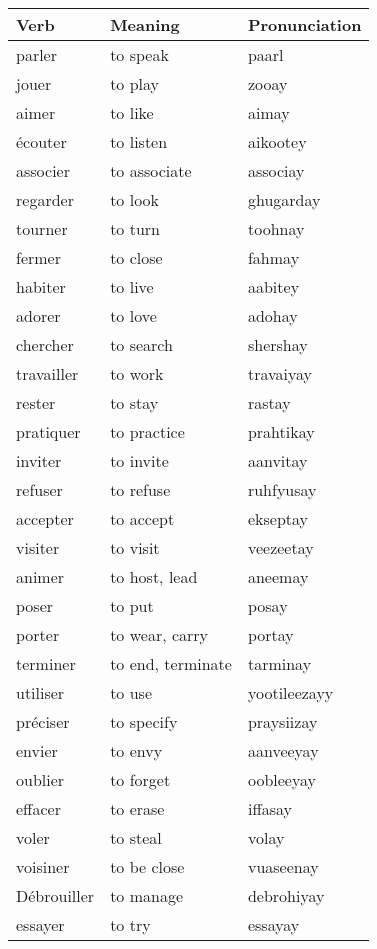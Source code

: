 \begin{longtable}{| l | l | l |}
\hline
Verb 		& Meaning 		& Pronunciation	\\
\hline
\endhead
parler		& to speak		& paarl			\\ 	\hline
jouer		& to play		& zooay			\\	\hline
aimer		& to like		& aimay			\\	\hline
\'ecouter	& to listen		& aikootey		\\	\hline
associer	& to associate	& associay		\\	\hline
regarder	& to look		& ghugarday		\\	\hline
tourner		& to turn		& toohnay		\\	\hline
fermer		& to close		& fahmay		\\	\hline
habiter		& to live		& aabitey		\\	\hline
adorer 		& to love		& adohay		\\	\hline
chercher	& to search		& shershay		\\	\hline
travailler	& to work		& travaiyay		\\	\hline
rester      & to stay       & rastay        \\  \hline
pratiquer   & to practice   & prahtikay     \\  \hline
inviter     & to invite     & aanvitay      \\  \hline
refuser     & to refuse     & ruhfyusay     \\  \hline
accepter    & to accept     & ekseptay      \\  \hline
visiter     & to visit      & veezeetay     \\  \hline
animer      & to host, lead & aneemay       \\  \hline
poser       & to put        & posay         \\  \hline
porter      & to wear, carry& portay        \\  \hline
terminer    & to end, terminate & tarminay  \\  \hline
utiliser    & to use        & yootileezayy  \\  \hline
pr\'eciser  & to specify    & praysiizay    \\  \hline
envier      & to envy       & aanveeyay     \\  \hline
oublier     & to forget     & oobleeyay     \\  \hline
effacer     & to erase      & iffasay       \\  \hline
voler       & to steal      & volay         \\  \hline
voisiner    & to be close   & vuaseenay     \\  \hline
D\'ebrouiller & to manage   & debrohiyay    \\  \hline
essayer     & to try        & essayay       \\  \hline
\end{longtable}

